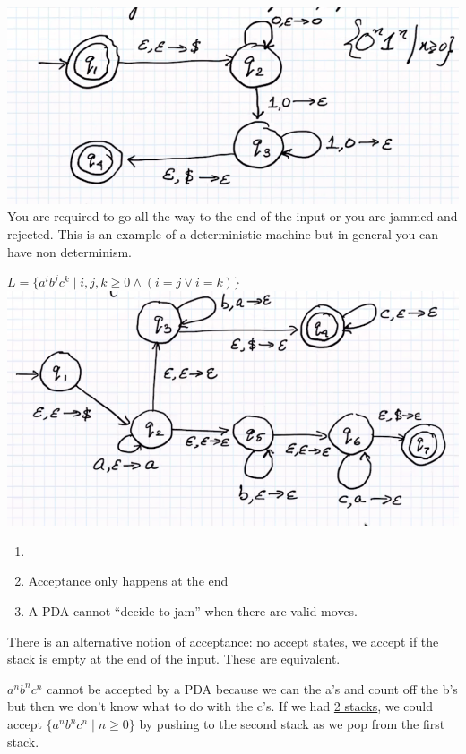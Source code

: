 \documentclass[../598comp.tex]{subfiles}
\begin{document}
\begin{example}
  \includegraphics[width=\textwidth]{pda_example}
  \\
  You are required to go all the way to the end of the input or you are jammed
  and rejected. This is an example of a deterministic machine but in general you
  can have non determinism.
\end{example}

\begin{example}
  $L = \{a^ib^jc^k \mid i, j, k \geq 0 \wedge (i = j \vee i = k)\}$
  \\
  \includegraphics[width=\textwidth]{pda_example2}
  \begin{note}
    \begin{enumerate}
    \item[]
    \item 
      Acceptance only happens at the end
    \item
      A PDA cannot ``decide to jam'' when there are valid moves.
    \end{enumerate}
  \end{note}
\end{example}

\begin{note}
  There is an alternative notion of acceptance: no accept states, we accept if
  the stack is empty at the end of the input. These are equivalent.
\end{note}
$a^nb^nc^n$ cannot be accepted by a PDA because we can the a's and count off the
b's but then we don't know what to do with the c's. If we had \ul{2 stacks}, we
could accept $\{a^nb^nc^n \mid n \geq 0\}$ by pushing to the second stack as we
pop from the first stack.
\end{document}
